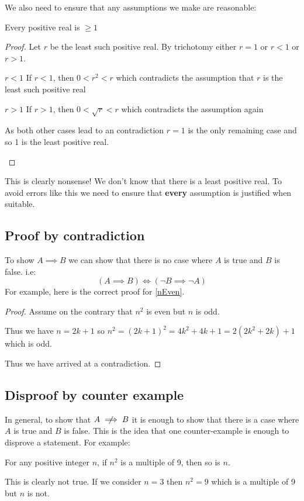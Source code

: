 \documentclass[../main.tex]{subfiles}
\begin{document}
We also need to ensure that any assumptions we make are reasonable:
\begin{proposition}
  Every positive real is $\geq 1$
\end{proposition}
\begin{proof}
  Let $r$ be the least such positive real.
  By trichotomy either $r = 1$ or $r < 1$ or $r > 1$.
  \begin{proofcases}
    \begin{case}{$r < 1$}
      If $r < 1$, then $0 < r^2 < r$ which contradicts the assumption that $r$ is the least such positive real
    \end{case}
    \begin{case}{$r > 1$}
      If $r > 1$, then $0 < \sqrt{r} < r$ which contradicts the assumption again
    \end{case}
    As both other cases lead to an contradiction $r = 1$ is the only remaining case and so 1 is the least positive real.
  \end{proofcases}
\end{proof}
This is clearly nonsense! We don't know that there is a least positive real.
To avoid errors like this we need to ensure that \textbf{every} assumption is justified when suitable.
\subsection{Proof by contradiction}
To show $A \implies B$ we can show that there is no case where $A$ is true and $B$ is false. i.e:
\[
  (A \implies B) \iff (\lnot B \implies \lnot A)
\]
For example, here is the correct proof for \cref{nEven}.
\begin{proof}
  Assume on the contrary that $n^2$ is even but $n$ is odd.

  Thus we have $n = 2k + 1$ so $n^2 = (2k + 1)^2 = 4k^2 + 4k + 1 = 2(2k^2 + 2k) + 1$ which is odd.

  Thus we have arrived at a contradiction.
\end{proof}
\subsection{Disproof by counter example}
In general, to show that $A \centernot\implies B$ it is enough to show that there is a case where $A$ is true and $B$ is false.
This is the idea that one counter-example is enough to disprove a statement.
For example:
\begin{proposition}
  For any positive integer $n$, if $n^2$ is a multiple of 9, then so is $n$.
\end{proposition}
This is clearly not true. If we consider $n = 3$ then $n^2 = 9$ which is a multiple of 9 but $n$ is not.
\end{document}
